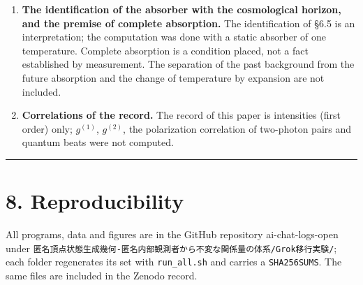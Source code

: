 \documentclass[
  a4paper,
]{article}
\begin{document}
\begin{enumerate}
  \(4\pi(R_H/l_P)^2\approx7\times10^{122}\). The value does not appear
  in the record.
\item
  \textbf{The identification of the absorber with the cosmological
  horizon, and the premise of complete absorption.} The identification
  of §6.5 is an interpretation; the computation was done with a static
  absorber of one temperature. Complete absorption is a condition
  placed, not a fact established by measurement. The separation of the
  past background from the future absorption and the change of
  temperature by expansion are not included.
\item
  \textbf{Correlations of the record.} The record of this paper is
  intensities (first order) only; \(g^{(1)}\), \(g^{(2)}\), the
  polarization correlation of two-photon pairs and quantum beats were
  not computed.
\end{enumerate}

\begin{center}\rule{0.5\linewidth}{0.5pt}\end{center}

\section{8. Reproducibility}\label{reproducibility}

All programs, data and figures are in the GitHub repository
ai-chat-logs-open under
\texttt{匿名頂点状態生成幾何-匿名内部観測者から不変な関係量の体系/Grok移行実験/};
each folder regenerates its set with \texttt{run\_all.sh} and carries a
\texttt{SHA256SUMS}. The same files are included in the Zenodo record.
\end{document}
